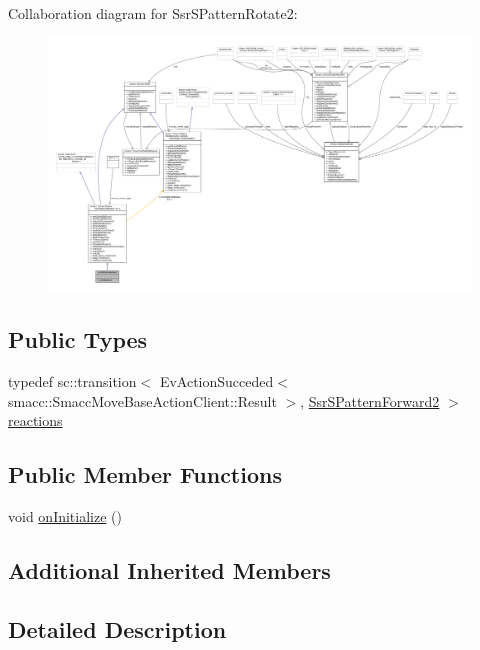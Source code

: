 Collaboration diagram for Ssr\+S\+Pattern\+Rotate2\+:
\nopagebreak
\begin{figure}[H]
\begin{center}
\leavevmode
\includegraphics[width=350pt]{structSsrSPatternRotate2__coll__graph}
\end{center}
\end{figure}
\subsection*{Public Types}
\begin{DoxyCompactItemize}
\item 
typedef sc\+::transition$<$ Ev\+Action\+Succeded$<$ smacc\+::\+Smacc\+Move\+Base\+Action\+Client\+::\+Result $>$, \hyperlink{structSsrSPatternForward2}{Ssr\+S\+Pattern\+Forward2} $>$ \hyperlink{structSsrSPatternRotate2_aadd9540839400886390b46afb9fb7eae}{reactions}
\end{DoxyCompactItemize}
\subsection*{Public Member Functions}
\begin{DoxyCompactItemize}
\item 
void \hyperlink{structSsrSPatternRotate2_acae719a6c582b769e997fd4a8f79d12a}{on\+Initialize} ()
\end{DoxyCompactItemize}
\subsection*{Additional Inherited Members}


\subsection{Detailed Description}


